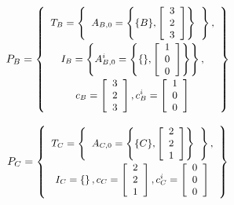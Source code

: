 \begin{displaymath} \small
P_B = \left\{
\begin{array}{c}
T_B = \left\{
\begin{array}{c}
A_{B,0} = \left\{ \{B\}, \left[\begin{array}{c} 3 \\ 2 \\ 3 \end{array}\right]\right\} \\
\end{array}\right\}, \\
I_B = \left\{ A^i_{B,0} = \left\{ \{ \}, \left[\begin{array}{c}1 \\ 0 \\ 0 \end{array}\right]\right\} \right\}, \\
c_B = \left[ \begin{array}{c} 3 \\ 2 \\ 3 \end{array} \right],
c^i_B = \left[ \begin{array}{c} 1 \\ 0 \\ 0
\end{array} \right]
\end{array}
\right\}
\end{displaymath}

\begin{displaymath} \small
P_C = \left\{
\begin{array}{c}
T_C = \left\{
\begin{array}{c}
A_{C,0} = \left\{ \{C\}, \left[\begin{array}{c} 2 \\ 2 \\ 1 \end{array}\right]\right\} \\
\end{array}\right\}, \\
I_C = \left\{ \right\}, c_C = \left[ \begin{array}{c} 2 \\ 2 \\ 1
\end{array} \right], c^i_C = \left[ \begin{array}{c} 0 \\ 0 \\ 0
\end{array} \right]
\end{array}
\right\}
\end{displaymath}

